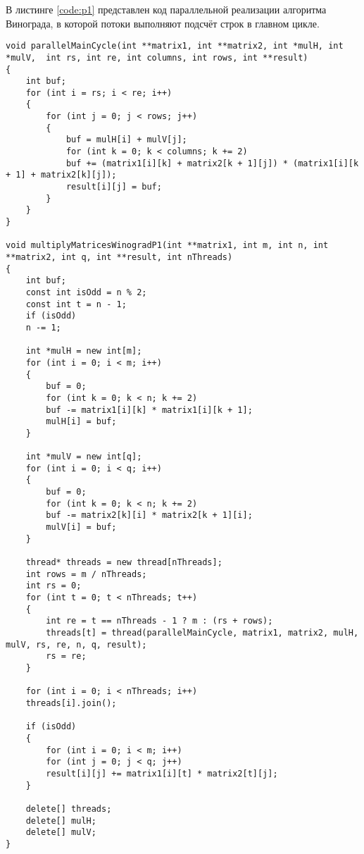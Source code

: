 \par В листинге \ref{code:p1} представлен код параллельной реализации алгоритма Винограда, в которой потоки выполняют подсчёт строк в главном цикле.
\begin{lstlisting}[caption= Первая параллельная реализация алгоритма Винограда, label=code:p1]
void parallelMainCycle(int **matrix1, int **matrix2, int *mulH, int *mulV,  int rs, int re, int columns, int rows, int **result)
{
	int buf;
	for (int i = rs; i < re; i++)
	{
		for (int j = 0; j < rows; j++)
		{
			buf = mulH[i] + mulV[j];
			for (int k = 0; k < columns; k += 2)
			buf += (matrix1[i][k] + matrix2[k + 1][j]) * (matrix1[i][k + 1] + matrix2[k][j]);
			result[i][j] = buf;
		}
	}
}

void multiplyMatricesWinogradP1(int **matrix1, int m, int n, int **matrix2, int q, int **result, int nThreads)
{
	int buf;
	const int isOdd = n % 2;
	const int t = n - 1;
	if (isOdd)
	n -= 1;
	
	int *mulH = new int[m];
	for (int i = 0; i < m; i++)
	{
		buf = 0;
		for (int k = 0; k < n; k += 2)
		buf -= matrix1[i][k] * matrix1[i][k + 1];
		mulH[i] = buf;
	}
	
	int *mulV = new int[q];
	for (int i = 0; i < q; i++)
	{
		buf = 0;
		for (int k = 0; k < n; k += 2)
		buf -= matrix2[k][i] * matrix2[k + 1][i];
		mulV[i] = buf;
	}
	
	thread* threads = new thread[nThreads];
	int rows = m / nThreads;
	int rs = 0;
	for (int t = 0; t < nThreads; t++)
	{
		int re = t == nThreads - 1 ? m : (rs + rows);
		threads[t] = thread(parallelMainCycle, matrix1, matrix2, mulH, mulV, rs, re, n, q, result);
		rs = re;
	}
	
	for (int i = 0; i < nThreads; i++)
	threads[i].join();
	
	if (isOdd)
	{
		for (int i = 0; i < m; i++)
		for (int j = 0; j < q; j++)
		result[i][j] += matrix1[i][t] * matrix2[t][j];
	}
	
	delete[] threads;
	delete[] mulH;
	delete[] mulV;
}
\end{lstlisting}

